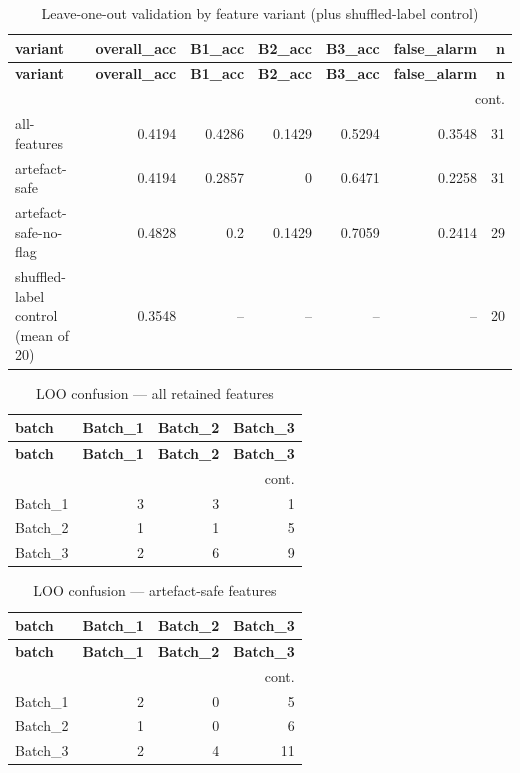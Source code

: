 \documentclass[11pt,a4paper]{article}
\begin{document}
\scriptsize
\begin{longtable}{lrrrrrr}
\caption{Leave-one-out validation by feature variant (plus shuffled-label control)}\label{tab:loo}\\
\toprule
\textbf{variant} & \textbf{overall\_acc} & \textbf{B1\_acc} & \textbf{B2\_acc} & \textbf{B3\_acc} & \textbf{false\_alarm} & \textbf{n} \\
\midrule
\endfirsthead
\toprule \textbf{variant} & \textbf{overall\_acc} & \textbf{B1\_acc} & \textbf{B2\_acc} & \textbf{B3\_acc} & \textbf{false\_alarm} & \textbf{n} \\
\midrule
\endhead
\midrule\multicolumn{7}{r}{\footnotesize cont.}\\\midrule\endfoot
\bottomrule\endlastfoot
all-features & 0.4194 & 0.4286 & 0.1429 & 0.5294 & 0.3548 & 31 \\
artefact-safe & 0.4194 & 0.2857 & 0 & 0.6471 & 0.2258 & 31 \\
artefact-safe-no-flag & 0.4828 & 0.2 & 0.1429 & 0.7059 & 0.2414 & 29 \\
shuffled-label control (mean of 20) & 0.3548 & -- & -- & -- & -- & 20 \\
\end{longtable}
\normalsize
\scriptsize
\begin{longtable}{lrrr}
\caption{LOO confusion --- all retained features}\label{tab:confallfeatures}\\
\toprule
\textbf{batch} & \textbf{Batch\_1} & \textbf{Batch\_2} & \textbf{Batch\_3} \\
\midrule
\endfirsthead
\toprule \textbf{batch} & \textbf{Batch\_1} & \textbf{Batch\_2} & \textbf{Batch\_3} \\
\midrule
\endhead
\midrule\multicolumn{4}{r}{\footnotesize cont.}\\\midrule\endfoot
\bottomrule\endlastfoot
Batch\_1 & 3 & 3 & 1 \\
Batch\_2 & 1 & 1 & 5 \\
Batch\_3 & 2 & 6 & 9 \\
\end{longtable}
\normalsize
\scriptsize
\begin{longtable}{lrrr}
\caption{LOO confusion --- artefact-safe features}\label{tab:confsafe}\\
\toprule
\textbf{batch} & \textbf{Batch\_1} & \textbf{Batch\_2} & \textbf{Batch\_3} \\
\midrule
\endfirsthead
\toprule \textbf{batch} & \textbf{Batch\_1} & \textbf{Batch\_2} & \textbf{Batch\_3} \\
\midrule
\endhead
\midrule\multicolumn{4}{r}{\footnotesize cont.}\\\midrule\endfoot
\bottomrule\endlastfoot
Batch\_1 & 2 & 0 & 5 \\
Batch\_2 & 1 & 0 & 6 \\
Batch\_3 & 2 & 4 & 11 \\
\end{longtable}
\end{document}
